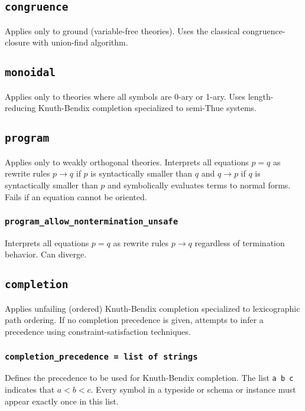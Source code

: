 \documentclass[10pt]{book}
\begin{document}
\subsection{{\tt congruence}}

 Applies only to ground (variable-free theories).  Uses the classical congruence-closure with union-find algorithm.

\subsection{{\tt monoidal}}

Applies only to theories where all symbols are 0-ary or 1-ary.  Uses length-reducing Knuth-Bendix completion specialized to semi-Thue systems.

\subsection{{\tt program}}

Applies only to weakly orthogonal theories.  Interprets all equations $p = q$ as rewrite rules $p \to q$ if $p$ is syntactically smaller than $q$ and $q \to p$ if $q$ is syntactically smaller than $p$ and symbolically evaluates terms to normal forms.  Fails if an equation cannot be oriented.

\subsubsection{{\tt program\_allow\_nontermination\_unsafe}}

Interprets all equations $p = q$ as rewrite rules $p \to q$ regardless of termination behavior.  Can diverge.

\subsection{{\tt completion}}

Applies unfailing (ordered) Knuth-Bendix completion specialized to lexicographic path ordering.  If no completion precedence is given, attempts to infer a precedence using constraint-satisfaction techniques.

\subsubsection{{\tt completion\_precedence = list of strings}}

Defines the precedence to be used for Knuth-Bendix completion.  The list {\tt a b c} indicates that $a < b < c$.  Every symbol in a typeside or schema or instance must appear exactly once in this list.
\end{document}
